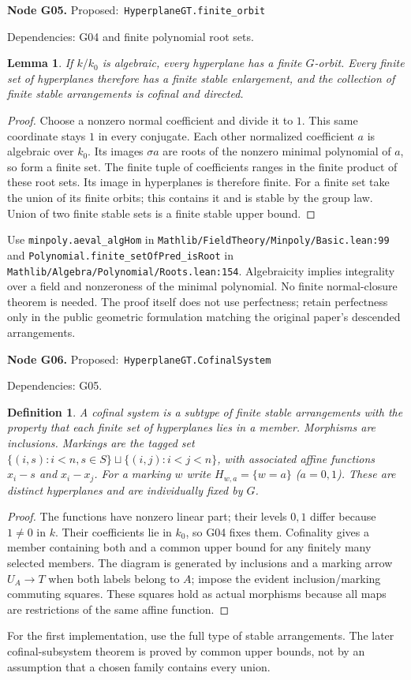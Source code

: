 \documentclass[11pt]{article}
\newtheorem{lemma}[theorem]{Lemma}
\newtheorem{definition}[theorem]{Definition}
\theoremstyle{remark}\newtheorem{remark}[theorem]{Remark}
\newcommand{\code}[1]{\nolinkurl{#1}}
\newcommand{\node}[3]{\par\Needspace{8\baselineskip}\smallskip\noindent\textbf{Node #1.}\quad
 \textsf{Proposed:}\ \code{#2}\par\noindent
 \textsf{Dependencies:} #3.\par\smallskip}
\begin{document}
\node{G05}{HyperplaneGT.finite_orbit}{G04 and finite polynomial root sets}
\begin{lemma}\label{lem:g05}
If $k/k_0$ is algebraic, every hyperplane has a finite $G$-orbit.
Every finite set of hyperplanes therefore has a finite stable
enlargement, and the collection of finite stable arrangements is
cofinal and directed.
\end{lemma}
\begin{proof}
Choose a nonzero normal coefficient and divide it to $1$. This same
coordinate stays $1$ in every conjugate. Each other normalized
coefficient $a$ is algebraic over $k_0$. Its images $\sigma a$ are
roots of the nonzero minimal polynomial of $a$, so form a finite
set. The finite tuple of coefficients ranges in the finite product
of these root sets. Its image in hyperplanes is therefore finite.
For a finite set take the union of its finite orbits; this contains
it and is stable by the group law. Union of two finite stable sets
is a finite stable upper bound.
\end{proof}
Use \code{minpoly.aeval_algHom} in
\code{Mathlib/FieldTheory/Minpoly/Basic.lean:99} and
\code{Polynomial.finite_setOfPred_isRoot} in
\code{Mathlib/Algebra/Polynomial/Roots.lean:154}. Algebraicity implies
integrality over a field and nonzeroness of the minimal polynomial.
No finite normal-closure theorem is needed. The proof itself does
not use perfectness; retain perfectness only in the public
geometric formulation matching the original paper's descended
arrangements.

\node{G06}{HyperplaneGT.CofinalSystem}{G05}
\begin{definition}\label{def:g06}
A cofinal system is a subtype of finite stable arrangements with
the property that each finite set of hyperplanes lies in a member.
Morphisms are inclusions. Markings are the tagged set
$\{(i,s):i<n,s\in S\}\sqcup\{(i,j):i<j<n\}$, with associated
affine functions $x_i-s$ and $x_i-x_j$. For a marking $w$ write
$H_{w,a}=\{w=a\}$ ($a=0,1$). These are distinct hyperplanes and
are individually fixed by $G$.
\end{definition}
\begin{proof}
The functions have nonzero linear part; their levels $0,1$ differ
because $1\ne0$ in $k$. Their coefficients lie in $k_0$, so G04
fixes them. Cofinality gives a member containing both and a common
upper bound for any finitely many selected members. The diagram
is generated by inclusions and a marking arrow $U_A\to T$ when
both labels belong to $A$; impose the evident inclusion/marking
commuting squares. These squares hold as actual morphisms because
all maps are restrictions of the same affine function.
\end{proof}
For the first implementation, use the full type of stable arrangements.
The later cofinal-subsystem theorem is proved by common upper bounds,
not by an assumption that a chosen family contains every union.
\end{document}
